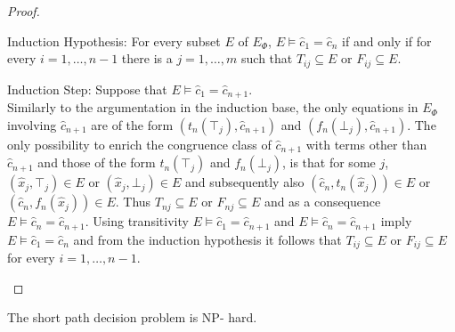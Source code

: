 \begin{proof}
\begin{paragraph}{Induction Hypothesis:} For every subset $E$ of $E_{\Phi}$, $E \models \hat{c}_1 = \hat{c}_{n}$ if and only if for every $i = 1,\ldots,n-1$ there is a $j = 1,\ldots,m$ such that $T_{ij} \subseteq E$ or $F_{ij} \subseteq E$.
\end{paragraph}

\begin{paragraph}{Induction Step:}
Suppose that $E \models \hat{c}_1 = \hat{c}_{n+1}$.\\
Similarly to the argumentation in the induction base, the only equations in $E_{\Phi}$ involving $\hat{c}_{n+1}$ are of the form $(t_n(\top_j),\hat{c}_{n+1})$ and $(f_n(\bot_j),\hat{c}_{n+1})$.
The only possibility to enrich the congruence class of $\hat{c}_{n+1}$ with terms other than $\hat{c}_{n+1}$ and those of the form $t_n(\top_j)$ and $f_n(\bot_j)$, 
is that for some $j$, $(\hat{x}_j,\top_j) \in E$ or $(\hat{x}_j,\bot_j) \in E$ and subsequently also $(\hat{c}_n,t_n(\hat{x}_j)) \in E$ or $(\hat{c}_n,f_n(\hat{x}_j)) \in E$.
Thus $T_{nj} \subseteq E$ or $F_{nj} \subseteq E$ and as a consequence $E \models \hat{c}_n = \hat{c}_{n+1}$.
Using transitivity $E \models \hat{c}_1 = \hat{c}_{n+1}$ and $E \models \hat{c}_n = \hat{c}_{n+1}$ imply $E \models \hat{c}_1 = \hat{c}_n$ and from the induction hypothesis it follows that  $T_{ij} \subseteq E$ or $F_{ij} \subseteq E$ for every $i = 1,\ldots,n-1$.
\end{paragraph}

\end{proof}

\begin{lemma}[NP- hardness]
\label{lemma:nphardness}
The short path decision problem is NP- hard.

\end{lemma}

